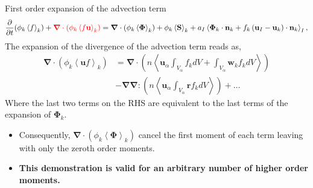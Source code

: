 \documentclass{sintefbeamer}
\newcommand{\kavg}[1]{\left<#1\right>_k}
\newcommand{\Iavg}[1]{\left<#1\right>_I}
\newcommand{\pavg}[1]{n \left<#1\right>}
\newcommand{\nablab}{\bm{\nabla}}
\newcommand{\pddt}{\frac{\partial}{\partial t}}
\begin{document}
\begin{frame}
  {First order expansion of the advection term}
  \begin{equation*}
    \pddt (\phi_k\kavg{f})
    +\textcolor{red}{\nablab \cdot \left(
        \phi_k \kavg{f \textbf{u}}
    \right)}
    = \nablab \cdot \left(
        \phi_k \kavg{\bm{\Phi}}
    \right)
    + \phi_k \kavg{\textbf{S}}
    + a_I \Iavg{
        \bm{\Phi}_k \cdot \textbf{n}_k
        + f_k 
        \left(
            \textbf{u}_I
            - \textbf{u}_k
        \right) \cdot \textbf{n}_k
    },
    \label{eq:avg_k_global}
\end{equation*}
  The expansion of the divergence of the advection term reads as, 
  \begin{align*}
    \nablab \cdot (\phi_k \kavg{\textbf{u} f})
    &= 
    \nablab \cdot \left(\pavg{
      \textbf{u}_\alpha  \int_{V_\alpha} f_k dV
      + \int_{V_\alpha} \textbf{w}_k f_k dV} \right)\\
    &- 
    \nablab\nablab : 
      \left(\pavg{\textbf{u}_\alpha  \int_{V_\alpha} \textbf{r} f_k dV} \right) +\ldots
\end{align*}
Where the last two terms on the RHS are equivalent to the last terms of the expansion of $\bm{\Phi}_k$.
\begin{itemize}
  \item Consequently, $\nablab \cdot \left(
    \phi_k \kavg{\bm{\Phi}}
\right)$ cancel the first moment of each term leaving with only the zeroth order moments. 
\item \textbf{This demonstration is valid for an arbitrary number of higher order moments.}
\end{itemize}
\end{frame}
\end{document}
